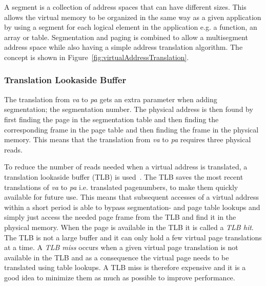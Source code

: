 A segment is a collection of address spaces that can have different sizes.
This allows the virtual memory to be organized in the same way as a given application by using a segment for each logical element in the application e.g. a function, an array or table.
Segmentation and paging is combined to allow a multisegment address space while also having a simple address translation algorithm. 
The concept is shown in Figure~\ref{fig:virtualAddressTranslation}.

\subsubsection{Translation Lookaside Buffer}
The translation from \textit{va} to \textit{pa} gets an extra parameter when adding segmentation; the segmentation number.
The physical address is then found by first finding the page in the segmentation table and then finding the corresponding frame in the page table and then finding the frame in the physical memory. 
This means that the translation from \textit{va} to \textit{pa} requires three physical reads.

To reduce the number of reads needed when a virtual address is translated, a translation lookaside buffer (TLB) is used~.
The TLB saves the most recent translations of \textit{va} to \textit{pa} i.e. translated pagenumbers, to make them quickly available for future use.
This means that subsequent accesses of a virtual address within a short period is able to bypass segmentation- and page table lookups and simply just access the needed page frame from the TLB and find it in the physical memory.
When the page is available in the TLB it is called a \textit{TLB hit}.
The TLB is not a large buffer and it can only hold a few virtual page translations at a time. 
A \textit{TLB miss} occurs when a given virtual page translation is not available in the TLB and as a consequence the virtual page needs to be translated using table lookups. 
A TLB miss is therefore expensive and it is a good idea to minimize them as much as possible to improve performance.
